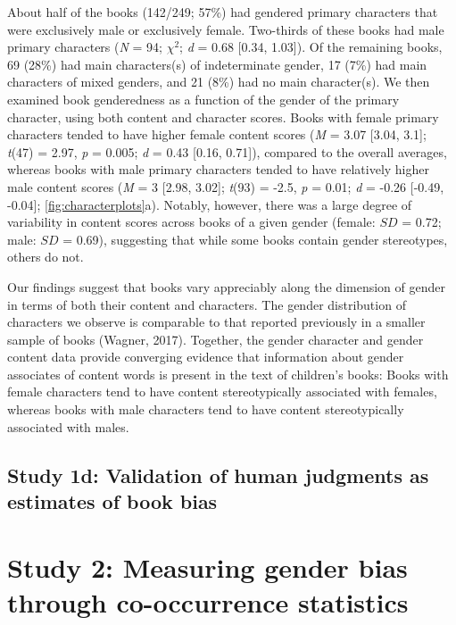 \documentclass[
  english,
  ,man,floatsintext]{apa6}
\begin{document}
About half of the books (142/249; 57\%) had gendered primary characters that were exclusively male or exclusively female. Two-thirds of these books had male primary characters (\emph{N} = 94; \(\chi^2\); \emph{d} = 0.68 {[}0.34, 1.03{]}). Of the remaining books, 69 (28\%) had main characters(s) of indeterminate gender, 17 (7\%) had main characters of mixed genders, and 21 (8\%) had no main character(s). We then examined book genderedness as a function of the gender of the primary character, using both content and character scores. Books with female primary characters tended to have higher female content scores (\emph{M} = 3.07 {[}3.04, 3.1{]}; \emph{t}(47) = 2.97, \emph{p} = 0.005; \emph{d} = 0.43 {[}0.16, 0.71{]}), compared to the overall averages, whereas books with male primary characters tended to have relatively higher male content scores (\emph{M} = 3 {[}2.98, 3.02{]}; \emph{t}(93) = -2.5, \emph{p} = 0.01; \emph{d} = -0.26 {[}-0.49, -0.04{]}; \autoref{fig:characterplots}a). Notably, however, there was a large degree of variability in content scores across books of a given gender (female: \(SD\) = 0.72; male: \(SD\) = 0.69), suggesting that while some books contain gender stereotypes, others do not.

Our findings suggest that books vary appreciably along the dimension of gender in terms of both their content and characters. The gender distribution of characters we observe is comparable to that reported previously in a smaller sample of books (Wagner, 2017). Together, the gender character and gender content data provide converging evidence that information about gender associates of content words is present in the text of children's books: Books with female characters tend to have content stereotypically associated with females, whereas books with male characters tend to have content stereotypically associated with males.

\hypertarget{study-1d-validation-of-human-judgments-as-estimates-of-book-bias}{%
\subsection{Study 1d: Validation of human judgments as estimates of book bias}\label{study-1d-validation-of-human-judgments-as-estimates-of-book-bias}}

\hypertarget{study-2-measuring-gender-bias-through-co-occurrence-statistics}{%
\section{Study 2: Measuring gender bias through co-occurrence statistics}\label{study-2-measuring-gender-bias-through-co-occurrence-statistics}}
\end{document}
